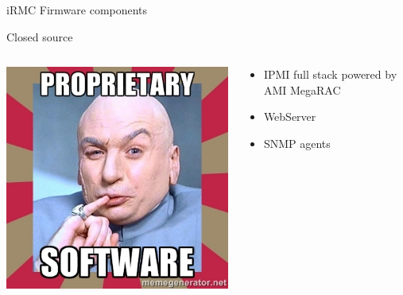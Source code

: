 \documentclass{beamer}
\begin{document}
\begin{frame}{iRMC Firmware components}
\begin{block}{Closed source}
		\begin{columns}[onlytextwidth]
			\begin{column}{0.3\textwidth}
				\begin{center}
					\includegraphics[width=\textwidth]{logo/proprietary-software.jpg}
				\end{center}
			\end{column}
			\begin{column}{0.6\textwidth}
				\begin{itemize}
					\item IPMI full stack powered by AMI MegaRAC
					\item WebServer 
					\item SNMP agents
				\end{itemize}
			\end{column}
		\end{columns}
	  \end{block}
  \end{frame}
\end{document}
